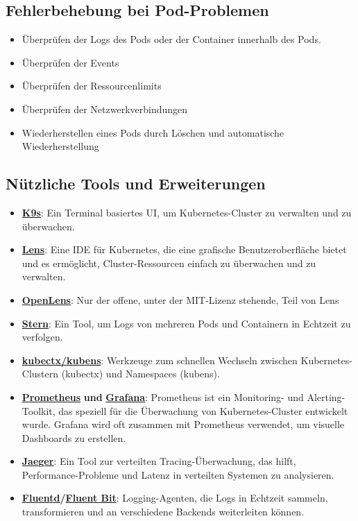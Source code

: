 \subsection{Fehlerbehebung bei Pod-Problemen}
\begin{itemize}
    \item Überprüfen der Logs des Pods oder der Container innerhalb des Pods.
    \item Überprüfen der Events
    \item Überprüfen der Ressourcenlimits
    \item Überprüfen der Netzwerkverbindungen
    \item Wiederherstellen eines Pods durch Löschen und automatische Wiederherstellung
\end{itemize}

\newpage

\subsection{Nützliche Tools und Erweiterungen}

\begin{itemize}
    \item \href{https://k9scli.io/}{\textbf{K9s}}: Ein Terminal basiertes UI, um Kubernetes-Cluster zu verwalten und zu überwachen.
    \item \href{https://k8slens.dev/}{\textbf{Lens}}: Eine IDE für Kubernetes, die eine grafische Benutzeroberfläche bietet und es ermöglicht, Cluster-Ressourcen einfach zu überwachen und zu verwalten.
    \item \href{https://github.com/MuhammedKalkan/OpenLens}{\textbf{OpenLens}}: Nur der offene, unter der MIT-Lizenz stehende, Teil von Lens
    \item \href{https://github.com/stern/stern}{\textbf{Stern}}: Ein Tool, um Logs von mehreren Pods und Containern in Echtzeit zu verfolgen.
    \item \href{https://github.com/ahmetb/kubectx}{\textbf{kubectx/kubens}}: Werkzeuge zum schnellen Wechseln zwischen Kubernetes-Clustern (kubectx) und Namespaces (kubens).
    \item \href{https://prometheus.io/}{\textbf{Prometheus}} \textbf{und} \href{https://grafana.com/}{\textbf{Grafana}}: Prometheus ist ein Monitoring- und Alerting-Toolkit, das speziell für die Überwachung von Kubernetes-Cluster entwickelt wurde. Grafana wird oft zusammen mit Prometheus verwendet, um visuelle Dashboards zu erstellen.
    \item \href{https://www.jaegertracing.io/}{\textbf{Jaeger}}: Ein Tool zur verteilten Tracing-Überwachung, das hilft, Performance-Probleme und Latenz in verteilten Systemen zu analysieren.
    \item \href{https://www.fluentd.org/}{\textbf{Fluentd}}\textbf{/}\href{https://fluentbit.io/}{\textbf{Fluent Bit}}: Logging-Agenten, die Logs in Echtzeit sammeln, transformieren und an verschiedene Backends weiterleiten können.
\end{itemize}

